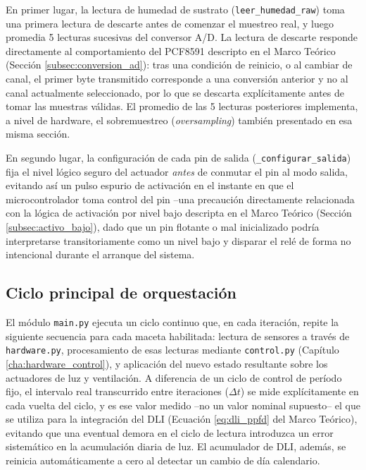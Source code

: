 En primer lugar, la lectura de humedad de sustrato (\texttt{leer\_humedad\_raw}) toma una primera lectura de descarte antes de comenzar el muestreo real, y luego promedia 5 lecturas sucesivas del conversor A/D. La lectura de descarte responde directamente al comportamiento del PCF8591 descripto en el Marco Teórico (Sección \ref{subsec:conversion_ad}): tras una condición de reinicio, o al cambiar de canal, el primer byte transmitido corresponde a una conversión anterior y no al canal actualmente seleccionado, por lo que se descarta explícitamente antes de tomar las muestras válidas. El promedio de las 5 lecturas posteriores implementa, a nivel de hardware, el sobremuestreo (\textit{oversampling}) también presentado en esa misma sección.

En segundo lugar, la configuración de cada pin de salida (\texttt{\_configurar\_salida}) fija el nivel lógico seguro del actuador \textit{antes} de conmutar el pin al modo salida, evitando así un pulso espurio de activación en el instante en que el microcontrolador toma control del pin --una precaución directamente relacionada con la lógica de activación por nivel bajo descripta en el Marco Teórico (Sección \ref{subsec:activo_bajo}), dado que un pin flotante o mal inicializado podría interpretarse transitoriamente como un nivel bajo y disparar el relé de forma no intencional durante el arranque del sistema.

\subsection{Ciclo principal de orquestación}
\label{subsec:ciclo_orquestacion}

El módulo \texttt{main.py} ejecuta un ciclo continuo que, en cada iteración, repite la siguiente secuencia para cada maceta habilitada: lectura de sensores a través de \texttt{hardware.py}, procesamiento de esas lecturas mediante \texttt{control.py} (Capítulo \ref{cha:hardware_control}), y aplicación del nuevo estado resultante sobre los actuadores de luz y ventilación. A diferencia de un ciclo de control de período fijo, el intervalo real transcurrido entre iteraciones ($\Delta t$) se mide explícitamente en cada vuelta del ciclo, y es ese valor medido --no un valor nominal supuesto-- el que se utiliza para la integración del DLI (Ecuación \ref{eq:dli_ppfd} del Marco Teórico), evitando que una eventual demora en el ciclo de lectura introduzca un error sistemático en la acumulación diaria de luz. El acumulador de DLI, además, se reinicia automáticamente a cero al detectar un cambio de día calendario.

